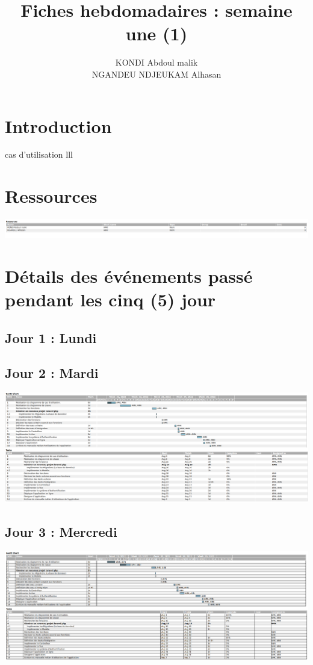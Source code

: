\documentclass[12pt,a4paper]{article}
\author{KONDI Abdoul malik \\ NGANDEU NDJEUKAM Alhasan}
\title{Fiches hebdomadaires : semaine une (1)}
\begin{document}
\maketitle
\tableofcontents
\newpage

\section{Introduction}
	cas d'utilisation
	lll
\section{Ressources}
\includegraphics[scale=0.25]{images/resources.png}
\section{Détails des événements passé pendant les cinq (5) jour}
\subsection{Jour 1 : Lundi}

\subsection{Jour 2 : Mardi}
\includegraphics[scale=0.23]{images/jour2.png}
\subsection{Jour 3 : Mercredi}
\includegraphics[scale=0.23]{images/jour3.png}
\end{document}
